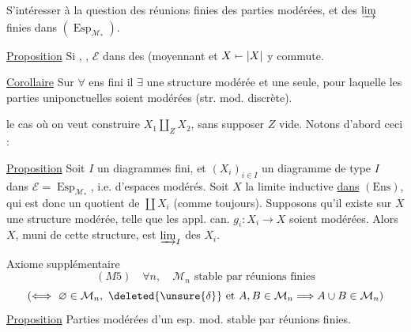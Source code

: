 S'intéresser à la question des réunions finies des parties modérées, et des $\varinjlim$ finies dans $(\operatorname{Esp}_{\mathcal M_*})$.


\uline{Proposition} Si , ,  $\mathcal E$
 dans des
 (moyennant  et $X\mathrel{\mapstochar\relbar}|X|$ y commute.

\uline{Corollaire} Sur $\forall$ ens fini il $\exists$ une structure modérée et une seule, pour laquelle les parties uniponctuelles soient modérées (str. mod. discrète).

 le cas où on veut construire $X_1\amalg_Z X_2$, sans supposer $Z$ vide. Notons d'abord ceci :

\uline{Proposition} Soit $I$ un   diagrammes fini, et $(X_i)_{i\in I}$ un diagramme de type $I$ dans $\mathcal E=\operatorname{Esp}_{\mathcal M_*}$, i.e. d'espaces modérés. Soit $X$ la limite inductive \uline{dans} $(\mathrm{Ens})$, qui est donc un  quotient de $\coprod X_i$ (comme toujours). Supposons qu'il existe sur $X$ une structure modérée, telle que les appl. can. $g_i:X_i\longrightarrow X$ soient modérées. Alors $X$, muni de cette structure, est  $\varinjlim_I$ des $X_i$.

Axiome supplémentaire
\[
 (M5)\quad \forall n,\quad \mathcal M_n\text{ stable par réunions finies}
\]
\[
 (\Longleftrightarrow\ \varnothing\in\mathcal M_n,\ \deleted{\unsure{\delta}}\text{ et }A,B\in\mathcal M_n\Longrightarrow A\cup B\in\mathcal M_n)
\]
\uline{Proposition} Parties modérées d'un esp. mod. stable par réunions finies.

